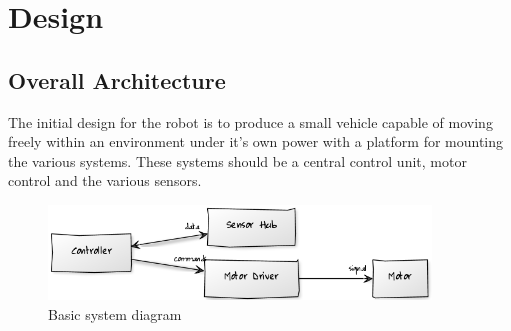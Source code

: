 \chapter{Design}








\section{Overall Architecture}
The initial design for the robot is to produce a small vehicle capable of moving freely within an environment under it's own power with a platform for mounting the various systems.  These systems should be a central control unit, motor control and the various sensors.

\begin{figure}[h]
\centering
        \includegraphics[width=4.0in] {Images/basic-uml.png}
        \caption{Basic system diagram}
        \label{Basic system diagram}
\end{figure}


